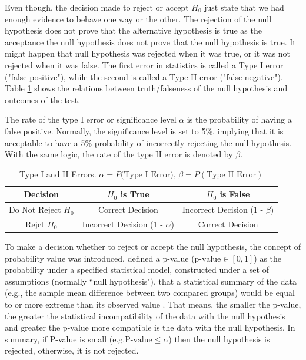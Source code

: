 Even though, the decision made to reject or accept $H_0$ just state that we had
enough evidence to behave one way or the other.
The rejection of the null hypothesis does not prove that the alternative hypothesis is true as
the acceptance the null hypothesis does not prove that the null hypothesis is true.
It might happen that null hypothesis was rejected when it was true, or it was not
rejected when it was false. The first error in statistics is called a Type I error ("false positive"),
 while the second is called a Type II error ("false negative").
Table \ref{type_errors} shows the relations between truth/falseness of the null hypothesis and outcomes of the test.

The rate of the type I error  or significance level
$\alpha$ is the probability of having a false positive.
Normally, the significance level is set to 5\%, implying that it is acceptable to have a 5\%
probability of incorrectly rejecting the null hypothesis. With the same logic, the rate of the
type II error is denoted by $\beta$.

\begin{table}[]
  \centering
  \caption{Type I and II Errors. $\alpha = P(\textrm{Type I Error)}$, $\beta = P(\textrm{Type II Error})$}
  \label{type_errors}
  \begin{tabular}{ccc}
    \toprule
    \textbf{Decision} & \textbf{$H_0$ is True} & \textbf{$H_0$ is False} \\ \midrule
  Do Not Reject $H_0$ & Correct Decision  & Incorrect Decision (1 - $\beta$)\\
  Rejct $H_0$ & Incorrect Decision (1 -  $\alpha$)& Correct Decision \\ \bottomrule
  \end{tabular}
\end{table}

To make a decision whether to reject or accept the null hypothesis, the concept of
probability value was introduced.
 defined a p-value  ($\textrm{p-value}\in [0,1]$) as the probability under a specified statistical model, constructed under a set of assumptions (normally “null hypothesis"), that a statistical summary of the data
(e.g., the sample mean difference between two compared groups) would be equal to or more extreme than its observed value \cite{wasserstein2016asa}. That means, the smaller the p-value, the greater the statistical incompatibility of the data with the null hypothesis and greater the p-value more compatible is the data with the null hypothesis.
In summary, if P-value is small (e.g.$\textrm{P-value} \leq \alpha$) then the null hypothesis is rejected,
otherwise, it is not rejected.

